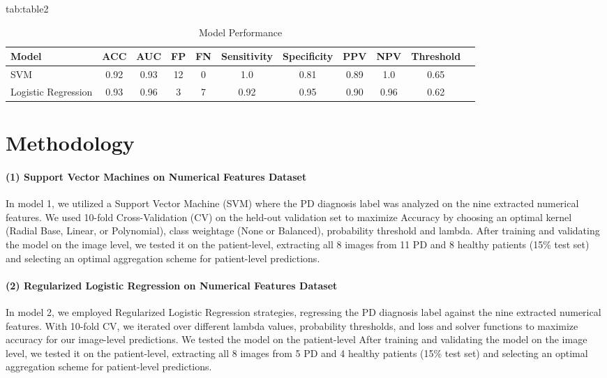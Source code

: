 \documentclass[pmlr,twocolumn,10pt]{jmlr} %
\begin{document}
\begin{table*}[hbtp]
\centering 
\floatconts
{tab:table2}
{\caption{Model Performance} }
    {
        \begin{tabular}{lcccccccccc}
        \toprule
        \bfseries Model & \bfseries ACC & \bfseries AUC & \bfseries FP & \bfseries FN & \bfseries Sensitivity & \bfseries Specificity & \bfseries PPV & \bfseries NPV & \bfseries Threshold \\
        \midrule
        SVM & 0.92 & 0.93 & 12 & 0 & 1.0 & 0.81 & 0.89 & 1.0 & 0.65 \\
        Logistic Regression & 0.93 & 0.96 & 3 & 7 & 0.92 & 0.95 & 0.90 & 0.96 & 0.62 \\
        \bottomrule
        \end{tabular}
    }
\end{table*}

\section{Methodology}
\label{Methodology}

\label{sec:SVM}  
\paragraph{(1) Support Vector Machines on Numerical Features Dataset} In model 1, we utilized a Support Vector Machine (SVM) where the PD diagnosis label was analyzed on the nine extracted numerical features. We used 10-fold Cross-Validation (CV) on the held-out validation set to maximize Accuracy by choosing an optimal kernel (Radial Base, Linear, or Polynomial), class weightage (None or Balanced), probability threshold and lambda. After training and validating the model on the image level, we tested it on the patient-level, extracting all 8 images from 11 PD and 8 healthy patients (15\% test set) and selecting an optimal aggregation scheme for patient-level predictions.  

\label{sec:LogReg}  
\paragraph{(2) Regularized Logistic Regression on Numerical Features Dataset} In model 2, we employed Regularized Logistic Regression strategies, regressing the PD diagnosis label against the nine extracted numerical features. With 10-fold CV, we iterated over different lambda values, probability thresholds, and loss and solver functions to maximize accuracy for our image-level predictions. We tested the model on the patient-level After training and validating the model on the image level, we tested it on the patient-level, extracting all 8 images from 5 PD and 4 healthy patients (15\% test set) and selecting an optimal aggregation scheme for patient-level predictions.  
\end{document}
